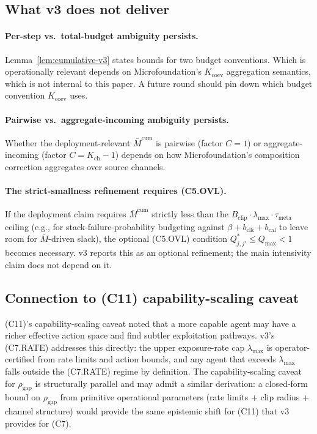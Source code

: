 \documentclass{article}
\newcommand{\Bclip}{B_{\mathrm{clip}}}
\newcommand{\Kch}{K_{\mathrm{ch}}}
\newcommand{\rhogap}{\rho_{\mathrm{gap}}}
\newcommand{\lammax}{\lambda_{\max}}
\newcommand{\taumeta}{\tau_{\mathrm{meta}}}
\newcommand{\bclk}{b_{\mathrm{clk}}}
\newcommand{\bcal}{b_{\mathrm{cal}}}
\begin{document}
\subsection{What v3 does not deliver}

\paragraph{Per-step vs.\ total-budget ambiguity persists.}
Lemma~\ref{lem:cumulative-v3} states bounds for two budget
conventions.  Which is operationally relevant depends on
Microfoundation's $K_{\mathrm{coev}}$ aggregation semantics, which
is not internal to this paper.  A future round should pin down
which budget convention $K_{\mathrm{coev}}$ uses.

\paragraph{Pairwise vs.\ aggregate-incoming ambiguity persists.}
Whether the deployment-relevant $\bar{M}^{\mathrm{cum}}$ is
pairwise (factor $C = 1$) or aggregate-incoming (factor $C = \Kch
- 1$) depends on how Microfoundation's composition correction
aggregates over source channels.

\paragraph{The strict-smallness refinement requires (C5.OVL).}  If
the deployment claim requires $\bar{M}^{\mathrm{cum}}$ strictly
less than the $\Bclip \cdot \lammax \cdot \taumeta$ ceiling
(e.g., for stack-failure-probability budgeting against $\beta +
\bclk + \bcal$ to leave room for $\bar{M}$-driven slack), the
optional (C5.OVL) condition $Q^*_{j,j'} \leq Q_{\max} < 1$ becomes
necessary.  v3 reports this as an optional refinement; the main
intensivity claim does not depend on it.

\subsection{Connection to (C11) capability-scaling caveat}

(C11)'s capability-scaling caveat noted that a more capable agent
may have a richer effective action space and find subtler
exploitation pathways.  v3's (C7.RATE) addresses this directly:
the upper exposure-rate cap $\lammax$ is operator-certified from
rate limits and action bounds, and any agent that exceeds
$\lammax$ falls outside the (C7.RATE) regime by definition.  The
capability-scaling caveat for $\rhogap$ is structurally parallel
and may admit a similar derivation: a closed-form bound on
$\rhogap$ from primitive operational parameters (rate limits +
clip radius + channel structure) would provide the same epistemic
shift for (C11) that v3 provides for (C7).
\end{document}
